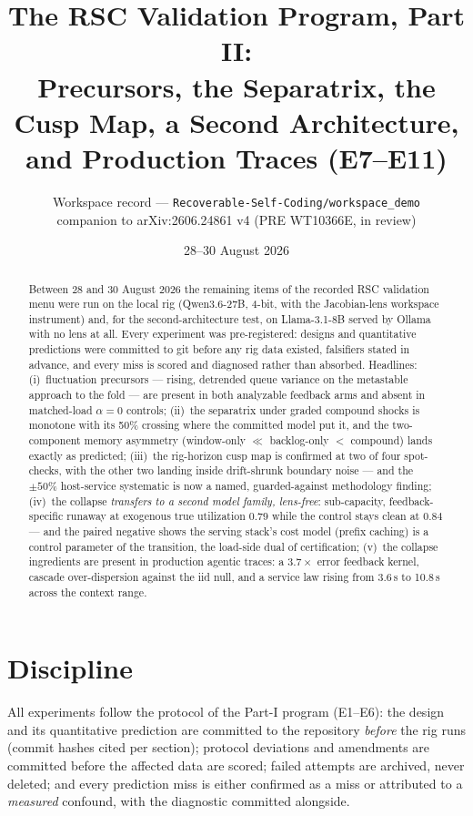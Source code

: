 \documentclass[11pt]{article}
\title{\textbf{The RSC Validation Program, Part II:}\\
Precursors, the Separatrix, the Cusp Map, a Second Architecture,\\
and Production Traces (E7--E11)}
\author{Workspace record --- \texttt{Recoverable-Self-Coding/workspace\_demo}\\
companion to arXiv:2606.24861 v4 (PRE WT10366E, in review)}
\date{28--30 August 2026}
\begin{document}
\maketitle

\begin{abstract}
\noindent
Between 28 and 30 August 2026 the remaining items of the recorded RSC
validation menu were run on the local rig (Qwen3.6-27B, 4-bit, with the
Jacobian-lens workspace instrument) and, for the second-architecture
test, on Llama-3.1-8B served by Ollama with no lens at all. Every
experiment was pre-registered: designs and quantitative predictions were
committed to git before any rig data existed, falsifiers stated in
advance, and every miss is scored and diagnosed rather than absorbed.
Headlines: (i)~fluctuation precursors --- rising, detrended queue
variance on the metastable approach to the fold --- are present in both
analyzable feedback arms and absent in matched-load $\alpha{=}0$
controls; (ii)~the separatrix under graded compound shocks is monotone
with its 50\% crossing where the committed model put it, and the
two-component memory asymmetry (window-only $\ll$ backlog-only $<$
compound) lands exactly as predicted; (iii)~the rig-horizon cusp map is
confirmed at two of four spot-checks, with the other two landing inside
drift-shrunk boundary noise --- and the $\pm 50\%$ host-service
systematic is now a named, guarded-against methodology finding;
(iv)~the collapse \emph{transfers to a second model family, lens-free}:
sub-capacity, feedback-specific runaway at exogenous true utilization
$0.79$ while the control stays clean at $0.84$ --- and the paired
negative shows the serving stack's cost model (prefix caching) is a
control parameter of the transition, the load-side dual of
certification; (v)~the collapse ingredients are present in production
agentic traces: a $3.7\times$ error feedback kernel, cascade
over-dispersion against the iid null, and a service law rising from
3.6\,s to 10.8\,s across the context range.
\end{abstract}

\section{Discipline}
All experiments follow the protocol of the Part-I program (E1--E6):
the design and its quantitative prediction are committed to the
repository \emph{before} the rig runs (commit hashes cited per section);
protocol deviations and amendments are committed before the affected
data are scored; failed attempts are archived, never deleted; and every
prediction miss is either confirmed as a miss or attributed to a
\emph{measured} confound, with the diagnostic committed alongside.
\end{document}
